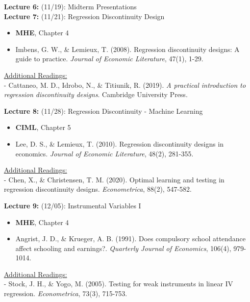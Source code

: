 \documentclass[12pt]{article}
\begin{document}
\vspace{2em}
\noindent\textbf{Lecture 6:} (11/19): Midterm Presentations \\

\vspace{2em}
\noindent\textbf{Lecture 7:} (11/21): Regression Discontinuity Design \\
\vspace{1em}
\begin{itemize}
    \item \textbf{MHE}, Chapter 4
    \item Imbens, G. W., \& Lemieux, T. (2008). Regression discontinuity designs: A guide to practice. \textit{Journal of Economic Literature}, 47(1), 1-29.
\end{itemize}
\vspace{1em}
\underline{Additional Readings:} \\
\hspace{1em} - Cattaneo, M. D., Idrobo, N., \& Titiunik, R. (2019). \textit{A practical introduction to regression discontinuity designs}. Cambridge University Press.

\vspace{2em}
\noindent\textbf{Lecture 8:} (11/28): Regression Discontinuity - Machine Learning \\
\vspace{1em}
\begin{itemize}
    \item \textbf{CIML}, Chapter 5
    \item Lee, D. S., \& Lemieux, T. (2010). Regression discontinuity designs in economics. \textit{Journal of Economic Literature}, 48(2), 281-355.
\end{itemize}
\vspace{1em}
\underline{Additional Readings:} \\
\hspace{1em} - Chen, X., \& Christensen, T. M. (2020). Optimal learning and testing in regression discontinuity designs. \textit{Econometrica}, 88(2), 547-582.

\vspace{2em}
\noindent\textbf{Lecture 9:} (12/05): Instrumental Variables I \\
\vspace{1em}
\begin{itemize}
    \item \textbf{MHE}, Chapter 4
    \item Angrist, J. D., \& Krueger, A. B. (1991). Does compulsory school attendance affect schooling and earnings?. \textit{Quarterly Journal of Economics}, 106(4), 979-1014.
\end{itemize}
\vspace{1em}
\underline{Additional Readings:} \\
\hspace{1em} - Stock, J. H., \& Yogo, M. (2005). Testing for weak instruments in linear IV regression. \textit{Econometrica}, 73(3), 715-753.
\end{document}
